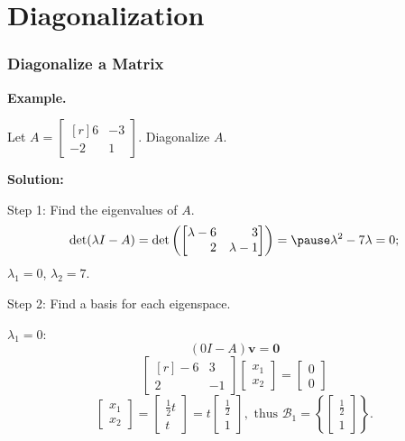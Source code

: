 \documentclass[10pt]{beamer}
\begin{document}
\section{Diagonalization}
\begin{frame}
\frametitle{Diagonalize a Matrix}

{\bf Example.} 

Let $A = \begin{bmatrix*}[r]
6&-3\\
-2&1
\end{bmatrix*}$. Diagonalize $A$.\pause

{\bf Solution:}

Step 1: Find the eigenvalues of $A$.
\[
\det(\lambda I - A) = \det\left(\begin{bmatrix*}[r]
\lambda - 6&3\\
2&\lambda - 1
\end{bmatrix*}\right) = \pause \lambda^2 - 7\lambda = 0;
\]
$\lambda_1 = 0$, $\lambda_2 = 7$.\pause

Step 2: Find a basis for each eigenspace.\pause

$\lambda_1 = 0$:\pause
\[
 (0 I - A)\mathbf v = \mathbf 0
\]
\pause
\[
\begin{bmatrix*}[r]
-6&3\\
2&-1
\end{bmatrix*}\begin{bmatrix}
x_1\\
x_2
\end{bmatrix} = \begin{bmatrix}
0\\0	
\end{bmatrix}
\]\pause
\[
\begin{bmatrix}
x_1\\
x_2	
\end{bmatrix} = \begin{bmatrix}
\frac{1}{2}t\\
t
\end{bmatrix} = t \begin{bmatrix}
\frac{1}{2}\\
1
\end{bmatrix}, \text{ thus } \mathscr B_1 = \left\{ \begin{bmatrix}
\frac{1}{2}\\
1
\end{bmatrix}\right\}.
\]

\end{frame}
\end{document}

